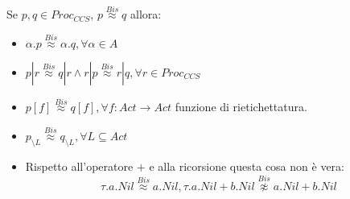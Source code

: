 \begin{teorema}
    Se $p, q \in Proc_{CCS}$, $p \stackrel{Bis}{\approx} q$ allora:
    \begin{itemize}
        \item $\alpha . p \stackrel{Bis}{\approx} \alpha . q, \forall \alpha \in A$
        \item $p | r \stackrel{Bis}{\approx} q | r \land r | p \stackrel{Bis}{\approx}
                  r | q, \forall r \in Proc_{CCS}$
        \item $p[f] \stackrel{Bis}{\approx} q[f], \forall f: Act \to Act$ funzione
              di rietichettatura.
        \item $p_{\setminus L} \stackrel{Bis}{\approx} q_{\setminus L}, \forall
                  L \subseteq Act$
        \item Rispetto all'operatore $+$ e alla ricorsione questa cosa non è vera:
              \begin{equation}
                  \tau . a . Nil \stackrel{Bis}{\approx} a.Nil, \tau . a . Nil + b.Nil
                  \stackrel{Bis}{\not\approx} a.Nil + b.Nil
              \end{equation}
    \end{itemize}
\end{teorema}
